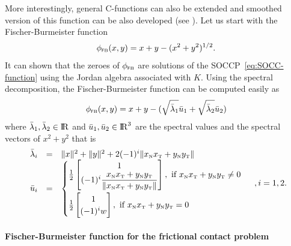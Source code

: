 More interestingly,  general C-functions can also be extended and smoothed version of this function can be also developed (see \cite{Fukushima.ea2001}
). Let us start with the Fischer-Burmeister function
\begin{equation}
  \label{eq:Jordan-FB}
  \phi_{\fb}(x,y) = x+y - (x^2 + y^2 )^{1/2}.
\end{equation}
It can shown that the zeroes of $\phi_{{\hbox{\tiny{\textsf FB}}}}$ are solutions of the SOCCP~\eqref{eq:SOCC-function} using the Jordan algebra associated with $K$. Using the spectral decomposition, the Fischer-Burmeister function can be computed easily as
\begin{equation}
  \label{eq:Jordan-FB-1}
  \phi_{\fb}(x,y) = x+y - (\sqrt{\bar \lambda_1} \bar u_1 + \sqrt{\bar \lambda_2} \bar u_2)
\end{equation}
where $\bar\lambda_1,\bar\lambda_2\in \mathrm{I\!R}$ and $\bar u_1,\bar u_2\in\mathrm{I\!R}^3$ are the spectral values and the spectral vectors of $x^2+y^2$ that is
\begin{equation}
  \label{eq:Jordan-FB-2}
  \begin{array}{rcl}
    \bar \lambda_i&=& \|x\|^2  + \|y\|^2 +   2 (-1)^i\|x_{\n}x_{\t} +y_{\n}y_{\t}\| \\
    \bar u_i &=&
    \begin{cases}
      \frac{1}{2}
      \begin{bmatrix}
        1 \\
        (-1)^i \Frac{x_{\n}x_{\t} +y_{\n}y_{\t}}{\|x_{\n}x_{\t} +y_{\n}y_{\t}\|}
      \end{bmatrix}, \text{ if } x_{\n}x_{\t} +y_{\n}y_{\t}\neq 0 \\[5mm]
       \frac{1}{2}
      \begin{bmatrix}
        1 \\
        (-1)^i w
      \end{bmatrix}, \text{ if } x_{\n}x_{\t} +y_{\n}y_{\t} = 0 \\
    \end{cases}
\end{array}, i = 1,2.
\end{equation}




\paragraph{Fischer-Burmeister function for the frictional contact problem}




